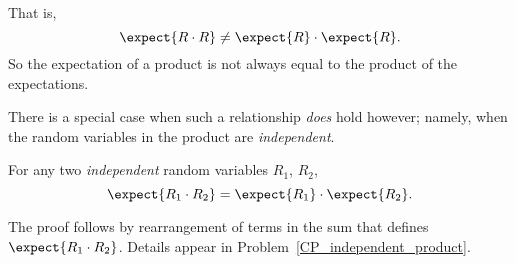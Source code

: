 \iffalse
\begin{align*}
\Expect{R^2}
    & = \sum_{\omega \in \sspace} R^2(\omega) \prob{w} \\
    & = \sum_{i=1}^6 i^2 \cdot \prob{R_i = i} \\
    & = \frac{1^2}{6} + \frac{2^2}{6} + \frac{3^2}{6} +
            \frac{4^2}{6} + \frac{5^2}{6} + \frac{6^2}{6} \\
    & =   15\; 1/6\\
    & \neq  12 \; 1/4.
\end{align*}
\fi

That is,
\[
    \expect{R \cdot R} \neq \expect{R} \cdot \expect{R}.
\]
So the expectation of a product is not always equal to the product of
the expectations.

There is a special case when such a relationship \emph{does} hold
however; namely, when the random variables in the product are
\emph{independent}.

\begin{theorem}\label{th:prod}
For any two \emph{independent} random variables $R_1$, $R_2$,
\[
\expect{R_1 \cdot R_2} = \expect{R_1} \cdot \expect{R_2}.
\]
\end{theorem}

The proof follows by rearrangement of terms in the sum that
defines $\expect{R_1 \cdot R_2}$.  Details appear in
Problem~\ref{CP_independent_product}.

